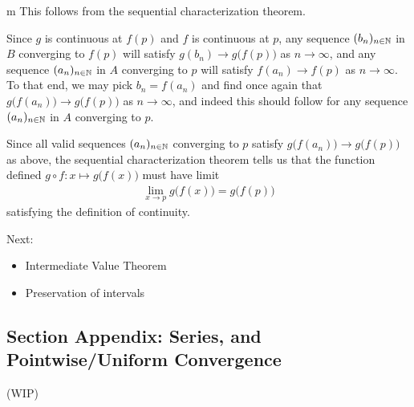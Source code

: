 \documentclass[11pt]{article}
\begin{document}
\begin{my proof}{m}
This follows from the sequential characterization theorem.

Since $g$ is continuous at $f(p)$ and $f$ is continuous at $p$, any sequence $(b_n)_{n\in \mathbb{N}}$ in $B$ converging to $f(p)$ will satisfy $g(b_n) \to g\big(f(p))$ as $n\to \infty$, and any sequence $(a_n)_{n\in \mathbb{N}}$ in $A$ converging to $p$ will satisfy $f(a_n) \to f(p)$ as $n \to \infty$. To that end, we may pick $b_n = f(a_n)$ and find once again that $g\big(f(a_n) \big) \to g\big(f(p) \big)$ as $n \to \infty$, and indeed this should follow for any sequence $(a_n)_{n\in \mathbb{N}}$ in $A$ converging to $p$.

Since all valid sequences $(a_n)_{n\in \mathbb{N}}$ converging to $p$ satisfy $g\big(f(a_n)\big) \to g\big(f(p)\big)$ as above, the sequential characterization theorem tells us that the function defined $g\circ f \colon x \mapsto g\big(f(x)\big)$ must have limit \begin{gather*}
\lim_{x \to p} g\big(f(x)\big) = g\big(f(p)\big)
\end{gather*}
satisfying the definition of continuity.
\end{my proof}


Next: \begin{itemize}
\item Intermediate Value Theorem
\item Preservation of intervals
\end{itemize}

\subsection{Section Appendix: Series, and Pointwise/Uniform Convergence}
(WIP)
\end{document}
